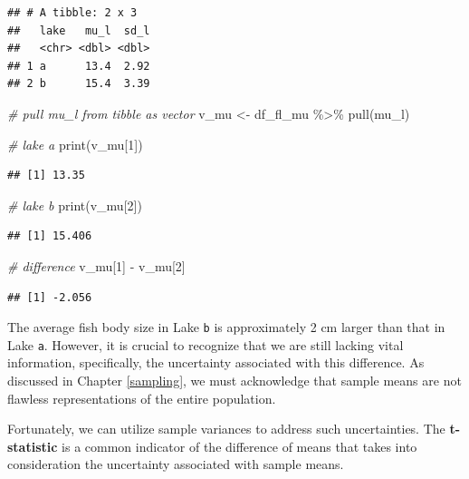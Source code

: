 \documentclass[
]{book}
\newenvironment{Shaded}{\begin{snugshade}}{\end{snugshade}}
\newcommand{\CommentTok}[1]{\textcolor[rgb]{0.56,0.35,0.01}{\textit{#1}}}
\newcommand{\DecValTok}[1]{\textcolor[rgb]{0.00,0.00,0.81}{#1}}
\newcommand{\FunctionTok}[1]{\textcolor[rgb]{0.00,0.00,0.00}{#1}}
\newcommand{\NormalTok}[1]{#1}
\newcommand{\OtherTok}[1]{\textcolor[rgb]{0.56,0.35,0.01}{#1}}
\newcommand{\SpecialCharTok}[1]{\textcolor[rgb]{0.00,0.00,0.00}{#1}}
\begin{document}
\begin{verbatim}
## # A tibble: 2 x 3
##   lake   mu_l  sd_l
##   <chr> <dbl> <dbl>
## 1 a      13.4  2.92
## 2 b      15.4  3.39
\end{verbatim}

\begin{Shaded}
\begin{Highlighting}[]
\CommentTok{\# pull mu\_l from tibble as vector}
\NormalTok{v\_mu }\OtherTok{\textless{}{-}}\NormalTok{ df\_fl\_mu }\SpecialCharTok{\%\textgreater{}\%} 
  \FunctionTok{pull}\NormalTok{(mu\_l)}

\CommentTok{\# lake a}
\FunctionTok{print}\NormalTok{(v\_mu[}\DecValTok{1}\NormalTok{])}
\end{Highlighting}
\end{Shaded}

\begin{verbatim}
## [1] 13.35
\end{verbatim}

\begin{Shaded}
\begin{Highlighting}[]
\CommentTok{\# lake b}
\FunctionTok{print}\NormalTok{(v\_mu[}\DecValTok{2}\NormalTok{])}
\end{Highlighting}
\end{Shaded}

\begin{verbatim}
## [1] 15.406
\end{verbatim}

\begin{Shaded}
\begin{Highlighting}[]
\CommentTok{\# difference}
\NormalTok{v\_mu[}\DecValTok{1}\NormalTok{] }\SpecialCharTok{{-}}\NormalTok{ v\_mu[}\DecValTok{2}\NormalTok{]}
\end{Highlighting}
\end{Shaded}

\begin{verbatim}
## [1] -2.056
\end{verbatim}

The average fish body size in Lake \texttt{b} is approximately 2 cm larger than that in Lake \texttt{a}. However, it is crucial to recognize that we are still lacking vital information, specifically, the uncertainty associated with this difference. As discussed in Chapter \ref{sampling}, we must acknowledge that sample means are not flawless representations of the entire population.

Fortunately, we can utilize sample variances to address such uncertainties. The \textbf{t-statistic} is a common indicator of the difference of means that takes into consideration the uncertainty associated with sample means.
\end{document}
